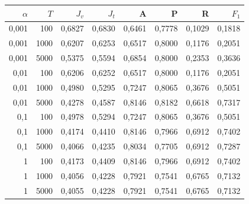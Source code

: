 \setlength{\tabcolsep}{4pt}
\begin{tabular}{rrrrrrrr}
\toprule
$\alpha$ & $T$ & $J_v$ & $J_t$ & A & P & R & $F_1$ \\
\midrule
0{,}001 & 100 & 0{,}6827 & 0{,}6830 & 0{,}6461 & 0{,}7778 & 0{,}1029 & 0{,}1818 \\
0{,}001 & 1000 & 0{,}6207 & 0{,}6253 & 0{,}6517 & 0{,}8000 & 0{,}1176 & 0{,}2051 \\
0{,}001 & 5000 & 0{,}5375 & 0{,}5594 & 0{,}6854 & 0{,}8000 & 0{,}2353 & 0{,}3636 \\
0{,}01 & 100 & 0{,}6206 & 0{,}6252 & 0{,}6517 & 0{,}8000 & 0{,}1176 & 0{,}2051 \\
0{,}01 & 1000 & 0{,}4980 & 0{,}5295 & 0{,}7247 & 0{,}8065 & 0{,}3676 & 0{,}5051 \\
0{,}01 & 5000 & 0{,}4278 & 0{,}4587 & 0{,}8146 & 0{,}8182 & 0{,}6618 & 0{,}7317 \\
0{,}1 & 100 & 0{,}4978 & 0{,}5294 & 0{,}7247 & 0{,}8065 & 0{,}3676 & 0{,}5051 \\
0{,}1 & 1000 & 0{,}4174 & 0{,}4410 & 0{,}8146 & 0{,}7966 & 0{,}6912 & 0{,}7402 \\
0{,}1 & 5000 & 0{,}4066 & 0{,}4235 & 0{,}8034 & 0{,}7705 & 0{,}6912 & 0{,}7287 \\
1 & 100 & 0{,}4173 & 0{,}4409 & 0{,}8146 & 0{,}7966 & 0{,}6912 & 0{,}7402 \\
1 & 1000 & 0{,}4056 & 0{,}4228 & 0{,}7921 & 0{,}7541 & 0{,}6765 & 0{,}7132 \\
1 & 5000 & 0{,}4055 & 0{,}4228 & 0{,}7921 & 0{,}7541 & 0{,}6765 & 0{,}7132 \\
\bottomrule
\end{tabular}
